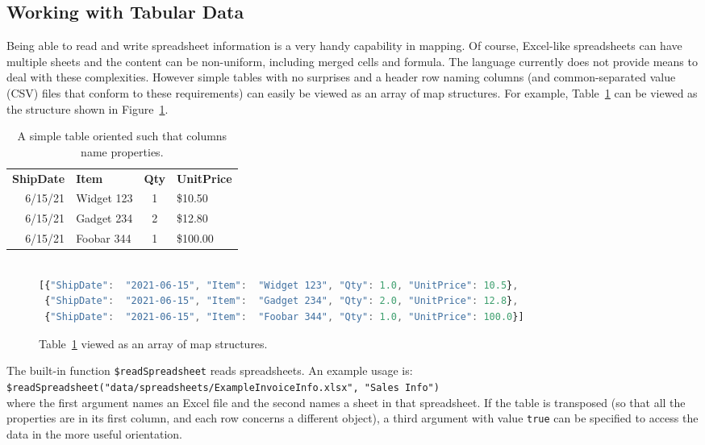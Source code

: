 \documentclass[9pt,letterpaper]{article}
\newcommand{\stt}[1]{\texttt{#1}} %
\begin{document}
\subsection{Working with Tabular Data}

Being able to read  and write spreadsheet information is a very handy capability in mapping.
Of course, Excel-like spreadsheets can have multiple sheets and the content can be non-uniform, including merged cells and formula.
The language currently does not provide means to deal with these complexities.
However simple tables with no surprises and a header row naming columns (and common-separated value (CSV) files that conform to these requirements) can easily be viewed as an array of map structures.
For example, Table~\ref{table:simple} can be viewed as the structure shown in Figure~\ref{code:simple}.

\begin{table}[H]
  \caption{A simple table oriented such that columns name properties.}
\label{table:simple}
\begin{tabular}{r | l | c | l}

\textbf{ShipDate}& \textbf{Item}& \textbf{Qty}& \textbf{UnitPrice} \\ \hhline{=|=|=|=}
        6/15/21	      & Widget 123   &	1	   &  \$10.50 \\
        6/15/21	      & Gadget 234   &	2	   &  \$12.80 \\
        6/15/21	      & Foobar 344   &	1	   &  \$100.00
\end{tabular}
\end{table}

\begin{figure}[H]
    \caption{Table~\ref{table:simple} viewed as an array of map structures.}
    \label{code:simple}
\begin{lstlisting}[language=JavaScript]

[{"ShipDate":  "2021-06-15", "Item":  "Widget 123", "Qty": 1.0, "UnitPrice": 10.5},
 {"ShipDate":  "2021-06-15", "Item":  "Gadget 234", "Qty": 2.0, "UnitPrice": 12.8},
 {"ShipDate":  "2021-06-15", "Item":  "Foobar 344", "Qty": 1.0, "UnitPrice": 100.0}]
\end{lstlisting}
\end{figure}

The built-in function \stt{\$readSpreadsheet} reads spreadsheets.
An example usage is:\\
\vspace{3mm}
\stt{\$readSpreadsheet("data/spreadsheets/ExampleInvoiceInfo.xlsx", "Sales Info")} \\
\vspace{3mm}
where the first argument names an Excel file and the second names a sheet in that spreadsheet.
If the table is transposed (so that all the properties are in its first column, and each row concerns a different object), a third argument with value \stt{true} can be specified to access the data in the more useful orientation.
\end{document}
